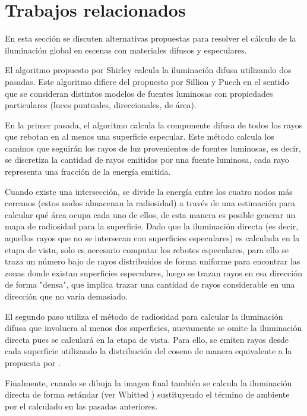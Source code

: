 \section{Trabajos relacionados}

En esta sección se discuten alternativas propuestas para resolver el cálculo de la iluminación global en escenas con materiales difusos y especulares.

El algoritmo propuesto por Shirley \cite{Shirley} calcula la iluminación difusa utilizando dos pasadas. Este algoritmo difiere del propuesto por Sillion y Puech \cite{Sillion} en el sentido que se consideran distintos modelos de fuentes luminosas con propiedades particulares (luces puntuales, direccionales, de área).

En la primer pasada, el algoritmo calcula la componente difusa de todos los rayos que rebotan en al menos una superficie especular. Este método calcula los caminos que seguirán los rayos de luz provenientes de fuentes luminosas, es decir, se discretiza la cantidad de rayos emitidos por una fuente luminosa, cada rayo representa una fracción de la energía emitida.

Cuando existe una intersección, se divide la energía entre los cuatro nodos más cercanos (estos nodos almacenan la radiosidad) a través de una estimación para calcular qué área ocupa cada uno de ellos, de esta manera es posible generar un mapa de radiosidad para la superficie. Dado que la iluminación directa (es decir, aquellos rayos que no se intersecan con superficies especulares) es calculada en la etapa de vista, solo es necesario computar los rebotes especulares, para ello se traza un número bajo de rayos distribuidos de forma uniforme para encontrar las zonas donde existan superficies especulares, luego se trazan rayos en esa dirección de forma "densa", que implica trazar una cantidad de rayos considerable en una dirección que no varía demasiado.

El segundo paso utiliza el método de radiosidad para calcular la iluminación difusa que involucra al menos dos superficies, nuevamente se omite la iluminación directa pues se calculará en la etapa de vista. Para ello, se emiten rayos desde cada superficie utilizando la distribución del coseno de manera equivalente a la propuesta por \citeauthor{Malley}. 

Finalmente, cuando se dibuja la imagen final también se calcula la iluminación directa de forma estándar (ver Whitted \cite{Whitted}) sustituyendo el término de ambiente por el calculado en las pasadas anteriores.

